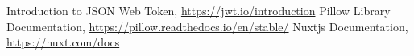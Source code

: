 \singlespace
{}
\begin{thebibliography}{}
	Introduction to JSON Web Token, \url{https://jwt.io/introduction}
	Pillow Library Documentation, \url{https://pillow.readthedocs.io/en/stable/}
	Nuxtjs Documentation, \url{https://nuxt.com/docs}

\end{thebibliography}